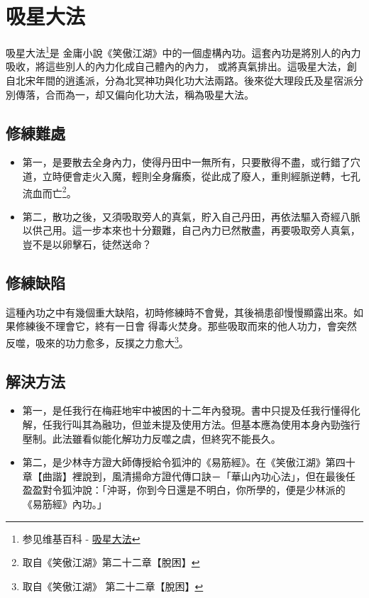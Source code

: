 \chapter{吸星大法}
吸星大法\footnote{参见维基百科 -
  \href{http://zh.wikipedia.org/wiki/\%E5\%90\%B8\%E6\%98\%9F\%E5\%A4\%A7\%E6\%B3\%95}{吸星大法}}是
金庸小說《笑傲江湖》中的一個虛構內功。這套內功是將別人的內力吸收，將這些別人的內力化成自己體內的內力，
或將真氣排出。這吸星大法，創自北宋年間的逍遙派，分為北冥神功與化功大法兩路。後來從大理段氏及星宿派分
別傳落，合而為一，却又偏向化功大法，稱為吸星大法。 

\section{修練難處}

\begin{itemize}
\item 第一，是要散去全身內力，使得丹田中一無所有，只要散得不盡，或行錯了穴道，立時便會走火入魔，輕則全身癱瘓，從此成了廢人，重則經脈逆轉，七孔流血而亡\footnote{取自《笑傲江湖》第二十二章【脫困】}。
\item 第二，散功之後，又須吸取旁人的真氣，貯入自己丹田，再依法驅入奇經八脈以供己用。這一步本來也十分艱難，自己內力已然散盡，再要吸取旁人真氣，豈不是以卵擊石，徒然送命？
\end{itemize}

\section{修練缺陷}

這種內功之中有幾個重大缺陷，初時修練時不會覺，其後禍患卻慢慢顯露出來。如果修練後不理會它，終有一日會
得毒火焚身。那些吸取而來的他人功力，會突然反噬，吸來的功力愈多，反撲之力愈大\footnote{取自《笑傲江湖》
  第二十二章【脫困】}。 

\section{解決方法}

\begin{itemize}
\item 第一，是任我行在梅莊地牢中被困的十二年內發現。書中只提及任我行懂得化解，任我行叫其為融功，但並未提及使用方法。但基本應為使用本身內勁強行壓制。此法雖看似能化解功力反噬之虞，但終究不能長久。
\item 第二，是少林寺方證大師傳授給令狐沖的《易筋經》。在《笑傲江湖》第四十章【曲諧】裡說到，風清揚命方證代傳口訣－「華山內功心法」，但在最後任盈盈對令狐沖說：「沖哥，你到今日還是不明白，你所學的，便是少林派的《易筋經》內功。」
\end{itemize}

